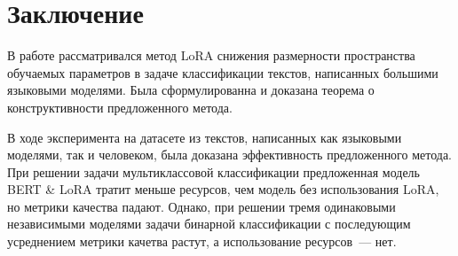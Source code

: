 \newpage

\section{Заключение}
В работе рассматривался метод LoRA снижения размерности пространства обучаемых параметров в задаче классификации текстов, написанных большими языковыми моделями. Была сформулированна и доказана теорема о конструктивности предложенного метода.

В ходе эксперимента на датасете из текстов, написанных как языковыми моделями, так и человеком, была доказана эффективность предложенного метода.
При решении задачи мультиклассовой классификации предложенная модель BERT \& LoRA  тратит меньше ресурсов, чем модель без использования LoRA, но метрики качества падают. Однако, при решении тремя одинаковыми независимыми моделями задачи бинарной классификации с последующим усреднением метрики качетва растут, а использование ресурсов~--- нет.

